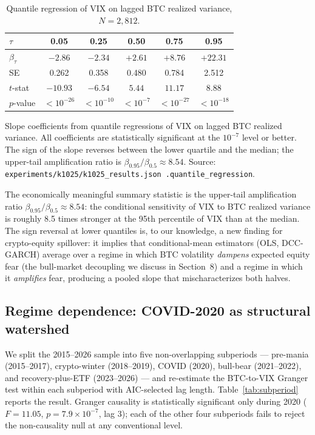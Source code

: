 \documentclass[11pt,a4paper]{article}
\begin{document}
\begin{table}[H]
\centering
\caption{Quantile regression of VIX on lagged BTC realized variance, $N = 2{,}812$.}
\label{tab:qr}
\begin{tabular}{lccccc}
\toprule
$\tau$ & 0.05 & 0.25 & 0.50 & 0.75 & 0.95 \\
\midrule
$\beta_\tau$ & $-2.86$ & $-2.34$ & $+2.61$ & $+8.76$ & $+22.31$ \\
SE          & 0.262   & 0.358   & 0.480   & 0.784   & 2.512   \\
$t$-stat    & $-10.93$ & $-6.54$ & $5.44$  & $11.17$ & $8.88$  \\
$p$-value   & $< 10^{-26}$ & $< 10^{-10}$ & $< 10^{-7}$ & $< 10^{-27}$ & $< 10^{-18}$ \\
\bottomrule
\end{tabular}
\begin{flushleft}
\footnotesize Slope coefficients from quantile regressions of VIX on lagged BTC realized variance. All coefficients are statistically significant at the $10^{-7}$ level or better. The sign of the slope reverses between the lower quartile and the median; the upper-tail amplification ratio is $\beta_{0.95} / \beta_{0.5} \approx 8.54$. Source: \texttt{experiments/k1025/k1025\_results.json .quantile\_regression}.
\end{flushleft}
\end{table}

The economically meaningful summary statistic is the upper-tail amplification ratio $\beta_{0.95} / \beta_{0.5} \approx 8.54$: the conditional sensitivity of VIX to BTC realized variance is roughly 8.5 times stronger at the 95th percentile of VIX than at the median. The sign reversal at lower quantiles is, to our knowledge, a new finding for crypto-equity spillover: it implies that conditional-mean estimators (OLS, DCC-GARCH) average over a regime in which BTC volatility \emph{dampens} expected equity fear (the bull-market decoupling we discuss in Section~8) and a regime in which it \emph{amplifies} fear, producing a pooled slope that mischaracterizes both halves.

\subsection{Regime dependence: COVID-2020 as structural watershed}
\label{subsec:r_regime}

We split the 2015--2026 sample into five non-overlapping subperiods --- pre-mania (2015--2017), crypto-winter (2018--2019), COVID (2020), bull-bear (2021--2022), and recovery-plus-ETF (2023--2026) --- and re-estimate the BTC-to-VIX Granger test within each subperiod with AIC-selected lag length. Table~\ref{tab:subperiod} reports the result. Granger causality is statistically significant only during 2020 ($F = 11.05$, $p = 7.9 \times 10^{-7}$, lag 3); each of the other four subperiods fails to reject the non-causality null at any conventional level.%
\end{document}
